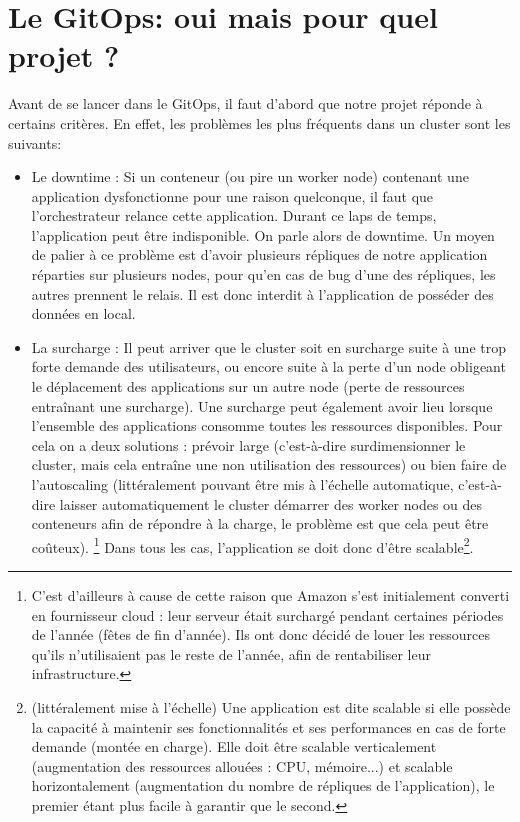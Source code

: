 \documentclass[11pt,fleqn]{book} %
\begin{document}
\section{Le GitOps: oui mais pour quel projet ?}
Avant de se lancer dans le GitOps, il faut d'abord que notre projet réponde à certains critères. En effet, les problèmes les plus fréquents dans un cluster sont les suivants: \\
\begin{itemize}
    \item Le downtime : Si un conteneur (ou pire un worker node) contenant une application dysfonctionne pour une raison quelconque, il faut que l'orchestrateur relance cette application. Durant ce laps de temps, l'application peut être indisponible. On parle alors de downtime. Un moyen de palier à ce problème est d'avoir plusieurs répliques de notre application réparties sur plusieurs nodes, pour qu'en cas de bug d'une des répliques, les autres prennent le relais. Il est donc interdit à l'application de posséder des données en local. \\
    
    \item La surcharge : Il peut arriver que le cluster soit en surcharge suite à une trop forte demande des utilisateurs, ou encore suite à la perte d'un node obligeant le déplacement des applications sur un autre node (perte de ressources entraînant une surcharge). Une surcharge peut également avoir lieu lorsque l'ensemble des  applications consomme toutes les ressources disponibles. Pour cela on a deux solutions : prévoir large (c'est-à-dire surdimensionner le cluster, mais cela entraîne une non utilisation des ressources) ou bien faire de l'autoscaling (littéralement pouvant être mis à l'échelle automatique, c'est-à-dire laisser automatiquement le cluster démarrer des worker nodes ou des conteneurs afin de répondre à la charge, le problème est que cela peut être coûteux). \footnote{C'est d'ailleurs à cause de cette raison que Amazon s'est initialement converti en fournisseur cloud : leur serveur était surchargé pendant certaines périodes de l'année (fêtes de fin d'année). Ils ont donc décidé de louer les ressources qu'ils n'utilisaient pas le reste de l'année, afin de rentabiliser leur infrastructure.} Dans tous les cas, l'application se doit donc d'être scalable\footnote{(littéralement mise à l'échelle) Une application est dite scalable si elle possède la capacité à maintenir ses fonctionnalités et ses performances en cas de forte demande (montée en charge). Elle doit être scalable verticalement (augmentation des ressources allouées :  CPU, mémoire...) et scalable horizontalement (augmentation du nombre de répliques de l'application), le premier étant plus facile à garantir que le second.}.\\


\end{itemize}
\end{document}
